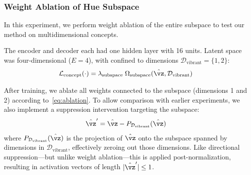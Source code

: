 %

\FloatBarrier\subsubsection{Weight Ablation of Hue Subspace}
\label{sec:ablation-hue}

In this experiment, we perform weight ablation of the entire  subspace to test our method on multidimensional concepts.

The encoder and decoder each had one hidden layer with 16 units. Latent space was four-dimensional ($E = 4$), with  confined to dimensions $\mathcal{D}_{\text{vibrant}} = \{1,2\}$:
%
\begin{equation}
    \mathcal{L}_{\text{concept}}(\cdot) = \lambda_{\text{subspace}} \; \Omega_{\text{subspace}}(\hat{\vz},\mathcal{D}_\text{vibrant})
\end{equation}

After training, we ablate all weights connected to the  subspace (dimensions 1 and 2) according to~\cref{eq:ablation}. To allow comparison with earlier experiments, we also implement a suppression intervention targeting the  subspace:
%
\begin{equation}
    \hat{\vz}' = \hat{\vz} - P_{\mathcal{D}_\text{vibrant}}(\hat{\vz})
\end{equation}
%
where $P_{\mathcal{D}_\text{vibrant}}(\hat{\vz})$ is the projection of $\hat{\vz}$ onto the subspace spanned by dimensions in $\mathcal{D}_\text{vibrant}$, effectively zeroing out those dimensions. Like directional suppression---but unlike weight ablation---this is applied post-normalization, resulting in activation vectors of length $|\hat{\vz}'| \le 1$.

